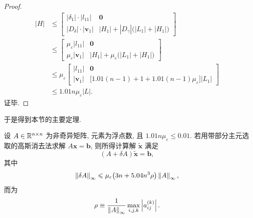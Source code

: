\begin{proof}
\[  \begin{aligned}
    |H|
    &\leqslant
    \begin{bmatrix}
      |\delta_1|\cdot|l_{11}| & \mathbf{0}\\
      |D_\delta|\cdot|\mathbf{v}_1| & |H_1|+|D_\gamma|\bigl(|L_1|+|H_1|\bigr)
    \end{bmatrix}\\
    &\leqslant
    \begin{bmatrix}
      \mu_\varepsilon|l_{11}| & \mathbf{0}\\
      \mu_\varepsilon|\mathbf{v}_1| & |H_1|+\mu_\varepsilon\bigl(|L_1|+|H_1|\bigr)
    \end{bmatrix}\\
    &\leqslant\mu_\varepsilon
    \begin{bmatrix}
      |l_{11}| & \mathbf{0}\\
      |\mathbf{v}_1| & \bigl[1.01(n-1)+1+1.01(n-1)\mu_\varepsilon\bigr]|L_1|
    \end{bmatrix}\\
    &\leqslant1.01n\mu_\varepsilon|L|.
  \end{aligned}
\]
证毕.
\end{proof}

于是得到本节的主要定理.

\begin{theorem}
\label{thm:3-12}
设 $A\in\mathbb{R}^{n\times n}$ 为非奇异矩阵, 元素为浮点数, 且 $1.01n\mu_\varepsilon\leqslant0.01$. 若用带部分主元选取的高斯消去法求解 $A\mathbf{x}=\mathbf{b}$, 则所得计算解 $\tilde{\mathbf{x}}$ 满足
\[
  (A+\delta A)\tilde{\mathbf{x}}=\mathbf{b},
\]
其中
\begin{equation}
  \left\|\delta A\right\|_\infty\leqslant\mu_\varepsilon\bigl(3n+5.04n^3\rho\bigr)\left\|A\right\|_\infty,
  \label{eq:3-17}
\end{equation}
而为
\[
  \rho\equiv\frac{1}{\left\|A\right\|_\infty}\max_{i,j,k}\left|a_{ij}^{(k)}\right|.
\]
\end{theorem}

